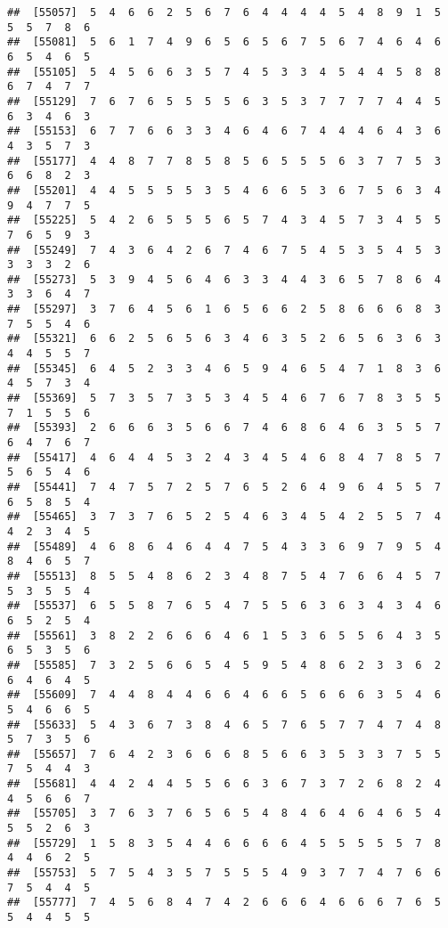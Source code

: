 \documentclass[
]{book}
\begin{document}
\begin{verbatim}
##  [55057]  5  4  6  6  2  5  6  7  6  4  4  4  4  5  4  8  9  1  5  5  5  7  8  6
##  [55081]  5  6  1  7  4  9  6  5  6  5  6  7  5  6  7  4  6  4  6  6  5  4  6  5
##  [55105]  5  4  5  6  6  3  5  7  4  5  3  3  4  5  4  4  5  8  8  6  7  4  7  7
##  [55129]  7  6  7  6  5  5  5  5  6  3  5  3  7  7  7  7  4  4  5  6  3  4  6  3
##  [55153]  6  7  7  6  6  3  3  4  6  4  6  7  4  4  4  6  4  3  6  4  3  5  7  3
##  [55177]  4  4  8  7  7  8  5  8  5  6  5  5  5  6  3  7  7  5  3  6  6  8  2  3
##  [55201]  4  4  5  5  5  5  3  5  4  6  6  5  3  6  7  5  6  3  4  9  4  7  7  5
##  [55225]  5  4  2  6  5  5  5  6  5  7  4  3  4  5  7  3  4  5  5  7  6  5  9  3
##  [55249]  7  4  3  6  4  2  6  7  4  6  7  5  4  5  3  5  4  5  3  3  3  3  2  6
##  [55273]  5  3  9  4  5  6  4  6  3  3  4  4  3  6  5  7  8  6  4  3  3  6  4  7
##  [55297]  3  7  6  4  5  6  1  6  5  6  6  2  5  8  6  6  6  8  3  7  5  5  4  6
##  [55321]  6  6  2  5  6  5  6  3  4  6  3  5  2  6  5  6  3  6  3  4  4  5  5  7
##  [55345]  6  4  5  2  3  3  4  6  5  9  4  6  5  4  7  1  8  3  6  4  5  7  3  4
##  [55369]  5  7  3  5  7  3  5  3  4  5  4  6  7  6  7  8  3  5  5  7  1  5  5  6
##  [55393]  2  6  6  6  3  5  6  6  7  4  6  8  6  4  6  3  5  5  7  6  4  7  6  7
##  [55417]  4  6  4  4  5  3  2  4  3  4  5  4  6  8  4  7  8  5  7  5  6  5  4  6
##  [55441]  7  4  7  5  7  2  5  7  6  5  2  6  4  9  6  4  5  5  7  6  5  8  5  4
##  [55465]  3  7  3  7  6  5  2  5  4  6  3  4  5  4  2  5  5  7  4  4  2  3  4  5
##  [55489]  4  6  8  6  4  6  4  4  7  5  4  3  3  6  9  7  9  5  4  8  4  6  5  7
##  [55513]  8  5  5  4  8  6  2  3  4  8  7  5  4  7  6  6  4  5  7  5  3  5  5  4
##  [55537]  6  5  5  8  7  6  5  4  7  5  5  6  3  6  3  4  3  4  6  6  5  2  5  4
##  [55561]  3  8  2  2  6  6  6  4  6  1  5  3  6  5  5  6  4  3  5  6  5  3  5  6
##  [55585]  7  3  2  5  6  6  5  4  5  9  5  4  8  6  2  3  3  6  2  6  4  6  4  5
##  [55609]  7  4  4  8  4  4  6  6  4  6  6  5  6  6  6  3  5  4  6  5  4  6  6  5
##  [55633]  5  4  3  6  7  3  8  4  6  5  7  6  5  7  7  4  7  4  8  5  7  3  5  6
##  [55657]  7  6  4  2  3  6  6  6  8  5  6  6  3  5  3  3  7  5  5  7  5  4  4  3
##  [55681]  4  4  2  4  4  5  5  6  6  3  6  7  3  7  2  6  8  2  4  4  5  6  6  7
##  [55705]  3  7  6  3  7  6  5  6  5  4  8  4  6  4  6  4  6  5  4  5  5  2  6  3
##  [55729]  1  5  8  3  5  4  4  6  6  6  6  4  5  5  5  5  5  7  8  4  4  6  2  5
##  [55753]  5  7  5  4  3  5  7  5  5  5  4  9  3  7  7  4  7  6  6  7  5  4  4  5
##  [55777]  7  4  5  6  8  4  7  4  2  6  6  6  4  6  6  6  7  6  5  5  4  4  5  5

\end{verbatim}
\end{document}
